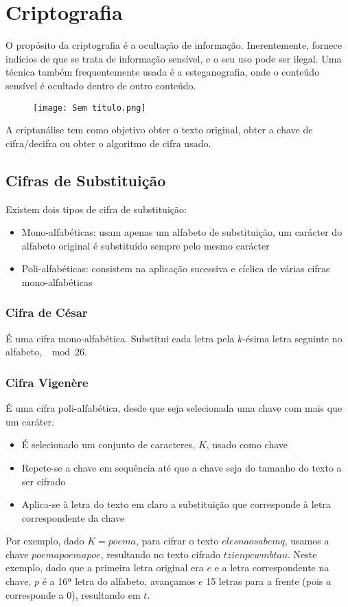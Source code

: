 \documentclass[10pt,a4paper]{report}
\begin{document}
\section{Criptografia}
O propósito da criptografia é a ocultação de informação. Inerentemente, fornece indícios de que se trata de informação sensível, e o seu uso pode ser ilegal. Uma técnica também frequentemente usada é a esteganografia, onde o conteúdo sensível é ocultado dentro de outro conteúdo.
\begin{figure}[H]
\centering
\texttt{[image: Sem título.png]}
\end{figure}
A criptanálise tem como objetivo obter o texto original, obter a chave de cifra/decifra ou obter o algoritmo de cifra usado.
\subsection{Cifras de Substituição}
Existem dois tipos de cifra de substituição:
\begin{itemize}
\item Mono-alfabéticas: usam apenas um alfabeto de substituição, um carácter do alfabeto original é substituído sempre pelo mesmo carácter
\item Poli-alfabéticas: consistem na aplicação sucessiva e cíclica de várias cifras mono-alfabéticas
\end{itemize}
\subsubsection{Cifra de César}
É uma cifra mono-alfabética. Substitui cada letra pela $k$-ésima letra seguinte no alfabeto, $\mod 26$.
\subsubsection{Cifra Vigenère}
É uma cifra poli-alfabética, desde que seja selecionada uma chave com mais que um caráter.
\begin{itemize}
\item É selecionado um conjunto de caracteres, $K$, usado como chave
\item Repete-se a chave em sequência até que a chave seja do tamanho do texto a
ser cifrado
\item Aplica-se à letra do texto em claro a substituição que corresponde à letra correspondente da chave
\end{itemize}
Por exemplo, dado $K = poema$, para cifrar o texto $elesnaosabemq$, usamos a chave $poemapoemapoe$, resultando no texto cifrado $tzienpcwmbtau$. Neste exemplo, dado que a primeira letra original era $e$ e a letra correspondente na chave, $p$ é a 16ª letra do alfabeto, avançamos $e$ 15 letras para a frente (pois $a$ corresponde a 0), resultando em $t$.
\end{document}
